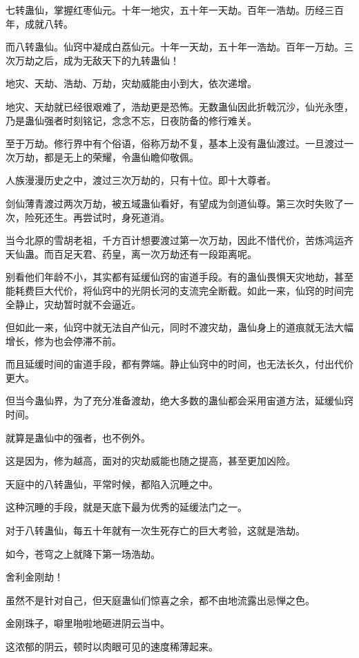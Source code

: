 \begin{this_body}
七转蛊仙，掌握红枣仙元。十年一地灾，五十年一天劫。百年一浩劫。历经三百年，成就八转。

而八转蛊仙。仙窍中凝成白荔仙元。十年一天劫，五十年一浩劫。百年一万劫。三次万劫之后，成为无敌天下的九转蛊仙！

地灾、天劫、浩劫、万劫，灾劫威能由小到大，依次递增。

地灾、天劫就已经很艰难了，浩劫更是恐怖。无数蛊仙因此折戟沉沙，仙光永堕，乃是蛊仙强者时刻铭记，念念不忘，日夜防备的修行难关。

至于万劫。修行界中有个俗语，俗称万劫不复，基本上没有蛊仙渡过。一旦渡过一次万劫，都是无上的荣耀，令蛊仙瞻仰敬佩。

人族漫漫历史之中，渡过三次万劫的，只有十位。即十大尊者。

剑仙薄青渡过两次万劫，被五域蛊仙看好，有望成为剑道仙尊。第三次时失败了一次，险死还生。再尝试时，身死道消。

当今北原的雪胡老祖，千方百计想要渡过第一次万劫，因此不惜代价，苦炼鸿运齐天仙蛊。而百足天君、药皇，离一次万劫还有一段距离呢。

别看他们年龄不小，其实都有延缓仙窍的宙道手段。有的蛊仙畏惧天灾地劫，甚至能耗费巨大代价，将仙窍中的光阴长河的支流完全断截。如此一来，仙窍的时间完全静止，灾劫暂时就不会逼近。

但如此一来，仙窍中就无法自产仙元，同时不渡灾劫，蛊仙身上的道痕就无法大幅增长，修为也会停滞不前。

而且延缓时间的宙道手段，都有弊端。静止仙窍中的时间，也无法长久，付出代价更大。

但当今蛊仙界，为了充分准备渡劫，绝大多数的蛊仙都会采用宙道方法，延缓仙窍时间。

就算是蛊仙中的强者，也不例外。

这是因为，修为越高，面对的灾劫威能也随之提高，甚至更加凶险。

天庭中的八转蛊仙，平常时候，都陷入沉睡之中。

这种沉睡的手段，就是天底下最为优秀的延缓法门之一。

对于八转蛊仙，每五十年就有一次生死存亡的巨大考验，这就是浩劫。

如今，苍穹之上就降下第一场浩劫。

舍利金刚劫！

虽然不是针对自己，但天庭蛊仙们惊喜之余，都不由地流露出忌惮之色。

金刚珠子，噼里啪啦地砸进阴云当中。

这浓郁的阴云，顿时以肉眼可见的速度稀薄起来。


\end{this_body}
